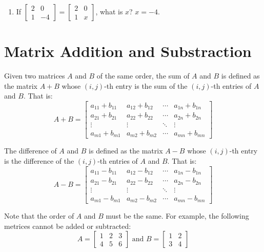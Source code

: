 \documentclass{report}
\begin{document}
\begin{multicols}{2}
\begin{enumerate}
    \item If $\begin{bmatrix}
              2 & 0  \\
              1 & -4
            \end{bmatrix} = \begin{bmatrix}
              2 & 0 \\
              1 & x
            \end{bmatrix}$, what is $x$?
          \sol{}
          $x = -4$.
  \end{enumerate}

  \section{Matrix Addition and Substraction}

  \doublespacing{}

  Given two matrices $A$ and $B$ of the same order, the sum of $A$ and $B$ is
  defined as the matrix $A + B$ whose $(i, j)$-th entry is the sum of the $(i,
    j)$-th entries of $A$ and $B$. That is: \[A + B = \begin{bmatrix}
      a_{11} + b_{11} & a_{12} + b_{12} & \cdots & a_{1n} + b_{1n} \\
      a_{21} + b_{21} & a_{22} + b_{22} & \cdots & a_{2n} + b_{2n} \\
      \vdots          & \vdots          & \ddots & \vdots          \\
      a_{m1} + b_{m1} & a_{m2} + b_{m2} & \cdots & a_{mn} + b_{mn}
    \end{bmatrix}\]

  The difference of $A$ and $B$ is defined as the matrix $A - B$ whose $(i,
    j)$-th entry is the difference of the $(i, j)$-th entries of $A$ and $B$. That
  is: \[A - B = \begin{bmatrix}
      a_{11} - b_{11} & a_{12} - b_{12} & \cdots & a_{1n} - b_{1n} \\
      a_{21} - b_{21} & a_{22} - b_{22} & \cdots & a_{2n} - b_{2n} \\
      \vdots          & \vdots          & \ddots & \vdots          \\
      a_{m1} - b_{m1} & a_{m2} - b_{m2} & \cdots & a_{mn} - b_{mn}
    \end{bmatrix}\]

  Note that the order of $A$ and $B$ must be the same. For example, the following
  metrices cannot be added or subtracted:
  \[
    A = \begin{bmatrix}
      1 & 2 & 3 \\
      4 & 5 & 6
    \end{bmatrix}
    \text{\ and\ }
    B = \begin{bmatrix}
      1 & 2 \\
      3 & 4
    \end{bmatrix}
  \]


\end{multicols}
\end{document}
